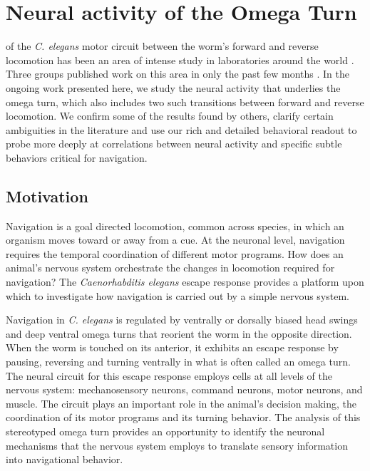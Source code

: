 \chapter{Neural activity of the Omega Turn}\label{chapter:omegaTurn}



 of the  \textit{C. elegans}  motor circuit between  the worm's forward and reverse locomotion has been an area of intense study in laboratories around the world \citep{piggott_neural_2011, faumont_image-free_2011, kawano_imbalancing_2011, ben_arous_automated_2010}.
Three groups published work on this area in only the past few months \citep{piggott_neural_2011, faumont_image-free_2011, kawano_imbalancing_2011}. In the ongoing work presented here, we study the neural activity that underlies the omega turn, which also includes two such transitions between  forward and reverse locomotion. We confirm some of the results found by others,  clarify certain ambiguities in the literature and use our rich and detailed behavioral readout to probe more deeply at correlations between  neural activity and specific subtle behaviors critical for navigation.


\section{Motivation}

Navigation is a goal directed locomotion, common across species, in which an organism moves toward or away from a cue.  At the neuronal level, navigation requires the temporal coordination of different motor programs.  How does an animal's nervous system orchestrate the changes in locomotion required for navigation? The \textit{Caenorhabditis elegans} escape response provides a platform upon which to investigate how navigation is carried out by a simple nervous system.  

Navigation in  \textit{C. elegans} is regulated by ventrally or dorsally biased head swings \citep{iino_parallel_2009} and deep ventral omega turns that reorient the worm in the opposite direction.  When the worm is touched on its anterior, it exhibits an escape response by pausing, reversing and turning ventrally in what is often called an omega turn.  The neural circuit for this escape response employs cells at all levels of the nervous system: mechanosensory neurons, command neurons, motor neurons, and muscle. The circuit plays an important role in the animal's decision making, the coordination of its motor programs and its turning behavior. 
The analysis of this stereotyped omega turn provides an opportunity to identify the  neuronal mechanisms that the nervous system employs to translate sensory information into navigational behavior.  


